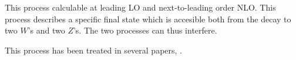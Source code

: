 This process calculable at leading LO and next-to-leading order NLO.
This process describes a specific final state which is accesible both
from the decay to two $W$'s and two $Z$'s.  The two processes can thus
interfere.

This process has been treated in several papers, \cite{Campbell:1999ah,Campbell:2011bn,Boughezal:2016wmq,Campbell:2022gdq}.
